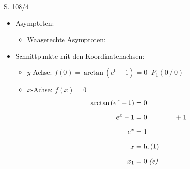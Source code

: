 \begin{Exercise}{S. 108/4}{}
\begin{enumerate}
\begin{enumerate}[label=\alph*),leftmargin=*]
{\begin{itemize}[leftmargin=*]
{\begin{align*}
                        \lim\limits_{x \to -\infty} \arctan\left(\overbrace{e^{x} - 1}^{\textcolor{myg}{-1^{+}}}\right) &= -{\dfrac{\pi}{4}}^{+}; \qquad \qquad \lim\limits_{x \to +\infty} \arctan\left(\overbrace{e^{x}-1}^{\textcolor{myg}{+\infty}}\right) &= + {\dfrac{\pi}{2}}^{-} &&\\[-3.0ex]
                    \end{align*}
                    }
                \item Asymptoten: \\[-3.0ex]{
                    \begin{itemize}
                        \item Waagerechte Asymptoten: 
                    \end{itemize}
                    }
                \item Schnittpunkte mit den Koordinatenachsen: \\[-2.0ex]{
                    \begin{itemize}
                        \item $y$-Achse: \quad $f(0) = \arctan\left(e^{0}-1\right) = 0$; \qquad $P_{1} \left( 0 \ / \ 0 \right)$\\[-1.0ex]
                        \item $x$-Achse: \quad $f(x) = 0$ \\[-2.0ex]{
                            \begin{align*}
                                \arctan\left(e^{x} - 1\right) &= 0 &&\\[1.5ex]
                                e^{x} - 1&= 0 &&| \quad + 1\\[1.5ex]
                                e^{x} &= 1 &&\\[1.5ex]
                                x&= \ln\left(1\right)\\[1.5ex]
                                x_{1} &= 0 \ \text{\textit{(e)}}&&\\[-3.0ex]
                            \end{align*}
}
\end{itemize}}
\end{itemize}}
\end{enumerate}
\end{enumerate}
\end{Exercise}

